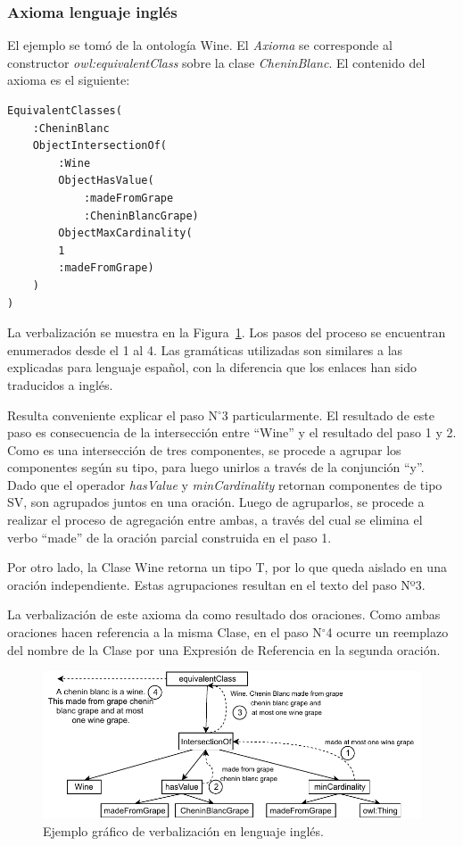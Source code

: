 \subsubsection{Axioma lenguaje inglés}
El ejemplo se tomó de la ontología Wine. El \textit{Axioma} se corresponde al constructor \emph{owl:equivalentClass} sobre la clase \emph{CheninBlanc}. El contenido del axioma es el siguiente: 

\begin{verbatim}
EquivalentClasses(
    :CheninBlanc
    ObjectIntersectionOf(
        :Wine
        ObjectHasValue(
            :madeFromGrape
            :CheninBlancGrape)
        ObjectMaxCardinality(
        1
        :madeFromGrape)
    )
)
\end{verbatim}
La verbalización se muestra en la Figura~\ref{fig:ejemplo_verb_ingles}.
Los pasos del proceso se encuentran enumerados desde el 1 al 4. Las gramáticas utilizadas son similares a las explicadas para lenguaje español, con la diferencia que los enlaces han sido traducidos a inglés.

Resulta conveniente explicar el paso N$^\circ$3 particularmente. El resultado de este paso es consecuencia de la intersección entre ``Wine'' y el resultado del paso 1 y 2. 
Como es una intersección de tres componentes, se procede a agrupar los componentes según su tipo, para luego unirlos a través de la conjunción ``y''. Dado que el operador \emph{hasValue} y \emph{minCardinality} retornan componentes de tipo SV, son agrupados juntos en una oración. Luego de agruparlos, se procede a realizar el proceso de agregación entre ambas, a través del cual se elimina el verbo ``made'' de la oración parcial construida en el paso 1. 

Por otro lado, la Clase Wine retorna un tipo T, por lo que queda aislado en una oración independiente. Estas agrupaciones resultan en el texto del paso Nº3.

La verbalización de este axioma da como resultado dos oraciones. Como ambas oraciones hacen referencia a la misma Clase, en el paso N$^\circ$4 ocurre un reemplazo del nombre de la Clase por una Expresión de Referencia en la segunda oración. 

\begin{figure}
    \centering
    \includegraphics[width=\textwidth]{img/generacion_documento/verbalizacion_equivalentClass_english.pdf}
    \caption{Ejemplo gráfico de verbalización en lenguaje inglés.}
    \label{fig:ejemplo_verb_ingles}
\end{figure}

